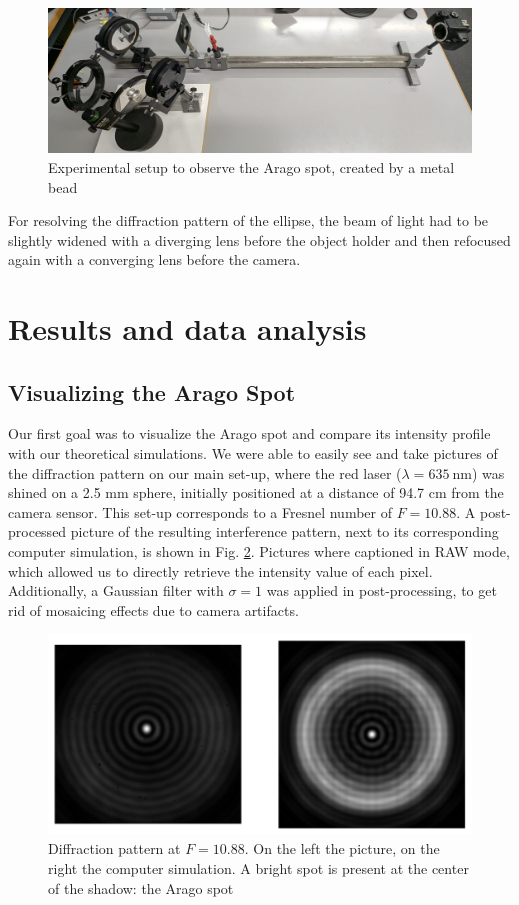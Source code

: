 \documentclass[11pt,a4paper]{article}
\begin{document}
\begin{figure}[h]
    \centering
    \includegraphics[width=0.7\linewidth]{1 - Arago Spot/Images/Setup Arago Spot.jpeg}
    \caption{Experimental setup to observe the Arago spot, created by a metal bead}
    \label{fig:enter-label}
\end{figure}


For resolving the diffraction pattern of the ellipse, the beam of light had to be slightly widened with a diverging lens before the object holder and then refocused again with a converging lens before the camera. 


\section{Results and data analysis}\label{sec:results}

\subsection{Visualizing the Arago Spot}

Our first goal was to visualize the Arago spot and compare its intensity profile with our theoretical simulations. We were able to easily see and take pictures of the diffraction pattern on our main set-up, where the red laser ($\lambda = 635 \ \text{nm}$) was shined on a 2.5 mm sphere, initially positioned at a distance of 94.7 cm from the camera sensor. This set-up corresponds to a Fresnel number of $F = 10.88$. A post-processed picture of the resulting interference pattern, next to its corresponding computer simulation, is shown in Fig. \ref{fig:Arago spot}. Pictures where captioned in RAW mode, which allowed us to directly retrieve the intensity value of each pixel. Additionally, a Gaussian filter with $\sigma = 1$ was applied in post-processing, to get rid of mosaicing effects due to camera artifacts.

\begin{figure}[H]
    \centering
    \includegraphics[width=0.5\linewidth]{1 - Arago Spot/Images/Arago-Spot.pdf}
    \caption{Diffraction pattern at $F = 10.88$. On the left the picture, on the right the computer simulation. A bright spot is present at the center of the shadow: the Arago spot}
    \label{fig:Arago spot}
\end{figure}
\end{document}
